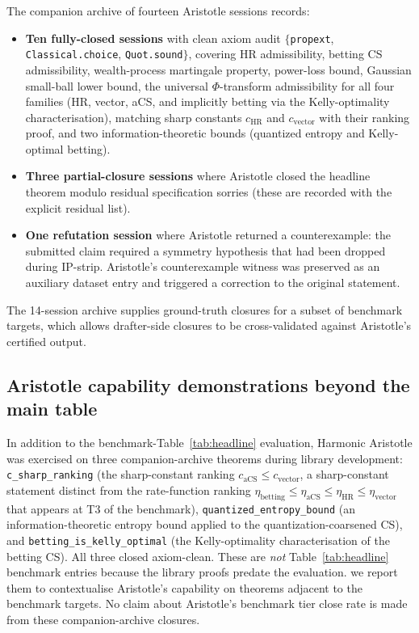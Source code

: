 The companion archive of fourteen Aristotle sessions records:
\begin{itemize}[leftmargin=1.3em, itemsep=0.15em]
\item \textbf{Ten fully-closed sessions} with clean axiom audit
$\{$\texttt{propext}, \texttt{Classical.choice}, \texttt{Quot.sound}$\}$,
covering HR admissibility, betting CS admissibility, wealth-process
martingale property, power-loss bound, Gaussian small-ball lower
bound, the universal $\Phi$-transform admissibility for all four
families (HR, vector, aCS, and implicitly betting via the Kelly-optimality
characterisation), matching sharp constants $c_{\mathrm{HR}}$ and
$c_{\mathrm{vector}}$ with their ranking proof, and two
information-theoretic bounds (quantized entropy and Kelly-optimal
betting).
\item \textbf{Three partial-closure sessions} where Aristotle
closed the headline theorem modulo residual specification sorries
(these are recorded with the explicit residual list).
\item \textbf{One refutation session} where Aristotle returned a
counterexample: the submitted claim required a symmetry hypothesis
that had been dropped during IP-strip. Aristotle's counterexample
witness was preserved as an auxiliary dataset entry and triggered
a correction to the original statement.
\end{itemize}

The 14-session archive supplies ground-truth closures for a subset
of benchmark targets, which allows drafter-side closures to be
cross-validated against Aristotle's certified output.

\subsection{Aristotle capability demonstrations beyond the main table}
\label{app:aristotle-companion}

In addition to the benchmark-Table~\ref{tab:headline} evaluation,
Harmonic Aristotle was exercised on three companion-archive theorems
during library development:
\texttt{c\_sharp\_ranking} (the sharp-constant ranking
$c_{\mathrm{aCS}} \leq c_{\mathrm{vector}}$, a sharp-constant
statement distinct from the rate-function ranking
$\eta_{\mathrm{betting}} \leq \eta_{\mathrm{aCS}} \leq
\eta_{\mathrm{HR}} \leq \eta_{\mathrm{vector}}$ that appears at
T3 of the benchmark),
\texttt{quantized\_entropy\_bound} (an information-theoretic
entropy bound applied to the quantization-coarsened CS), and
\texttt{betting\_is\_kelly\_optimal} (the Kelly-optimality
characterisation of the betting CS). All three closed axiom-clean.
These are \emph{not} Table~\ref{tab:headline} benchmark entries
because the library proofs predate the evaluation. we report them
to contextualise Aristotle's capability on theorems adjacent to the
benchmark targets. No claim about Aristotle's benchmark tier close
rate is made from these companion-archive closures.

